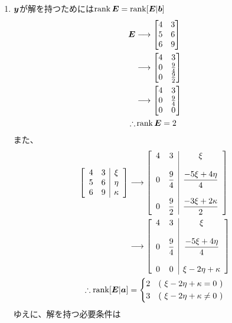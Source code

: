 \begin{ans*}
\begin{enumerate}[label=(\arabic*)]
    \item ${\bm{y}}$が解を持つためには$\operatorname{rank} \bm{E} = \operatorname{rank} [\bm{E}|{\bm{b}}]$
    \begin{align}
      \bm{E}
      &\longrightarrow \begin{bmatrix}
        4 & 3 \\
        5 & 6 \\
        6 & 9
      \end{bmatrix} \\
      &\longrightarrow \begin{bmatrix}
        4 & 3 \\
        0 & \frac{9}{4} \\
        0 & \frac{9}{2}
      \end{bmatrix} \\
      &\longrightarrow \begin{bmatrix}
        4 & 3 \\
        0 & \frac{9}{4} \\
        0 & 0
      \end{bmatrix} \\
      \therefore & \operatorname{rank} \bm{E} = 2
    \end{align}
    また、
    \begin{align}
      \left[\begin{array}{cc|c}
        4 & 3 & \xi \\
        5 & 6 & \eta \\
        6 & 9 & \grk
      \end{array}\right]
      &\lra \left[\begin{array}{cc|c}
        4 & 3 & \xi \\
        &&\\
        0 & \disp\frac{9}{4} & \disp\frac{-5 \xi + 4\eta}{4} \\
        &&\\
        0 & \disp\frac{9}{2} & \disp\frac{-3 \xi + 2\grk}{2}
      \end{array}\right] \\
      &\lra \left[\begin{array}{cc|c}
        4 & 3 & \xi \\
        &&\\
        0 & \disp\frac{9}{4} & \disp\frac{-5 \xi + 4\eta}{4} \\
        &&\\
        0 & 0 & \xi - 2\eta + \grk
      \end{array}\right] \\
      \therefore\rank[\bE|\ba]&=
      \begin{dcases*}
        2 & (\dm{\xi - 2 \eta + \grk = 0}) \\
        3 & (\dm{\xi - 2 \eta + \grk \neq 0})
      \end{dcases*}
    \end{align}
    ゆえに、解を持つ必要条件は
  \end{enumerate}
\end{ans*}
